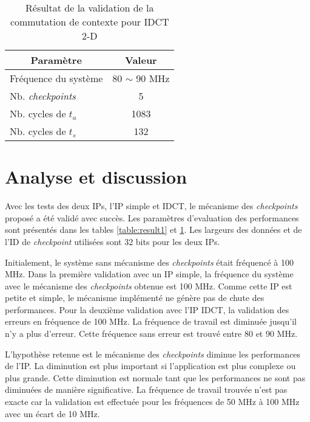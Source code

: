 \begin{table}[h]
	\caption{Résultat de la validation de la commutation de contexte pour IDCT 2-D}
 	\label{table:result2}
	\vspace{-2mm}
	\begin{center}
		\begin{tabular}{|l|c|}
			\hline
			\multicolumn{1}{|c|}{\cellcolor{black!30} \textbf{Paramètre}}   				& 	\multicolumn{1}{c|}{\cellcolor{black!30} \textbf{Valeur}} 	\\
			\hline
			Fréquence du système	&	80 $\sim$ 90 MHz	\\
			Nb. \emph{checkpoints}	&	5 			\\
			Nb. cycles de $t_a$		&	1083		\\
			Nb. cycles de $t_s$		&	132			\\
			\hline
		\end{tabular}
	\end{center}
	\vspace{-5mm}
\end{table}

\section{Analyse et discussion}

Avec les tests des deux IPs, l'IP simple et IDCT, le mécanisme des \emph{checkpoints} proposé a été validé avec succès.
Les paramètres d'evaluation des performances sont présentés dans les tables \ref{table:result1} et \ref{table:result2}.
Les largeurs des données et de l'ID de \emph{checkpoint} utilisées sont 32 bits pour les deux IPs.

Initialement, le système sans mécanisme des \emph{checkpoints} était fréquencé à 100 MHz.
Dans la première validation avec un IP simple, la fréquence du système avec le mécanisme des
\emph{checkpoints} obtenue est 100 MHz. Comme cette IP est petite et simple, le mécanisme
implémenté ne génère pas de chute des performances.
Pour la deuxième validation avec l'IP IDCT, la validation des erreurs en fréquence de 100 MHz.
La fréquence de travail est diminuée jusqu'il n'y a plus d'erreur. Cette fréquence sans erreur est trouvé entre 80 et 90 MHz.

L'hypothèse retenue est le mécanisme des \emph{checkpoints} diminue les performances de l'IP. La diminution est plus important
si l'application est plus complexe ou plus grande. Cette diminution est normale tant que les performances ne sont pas diminuées
de manière significative. La fréquence de travail trouvée n'est pas exacte car la validation est effectuée pour les fréquences de
50 MHz à 100 MHz avec un écart de 10 MHz. 

